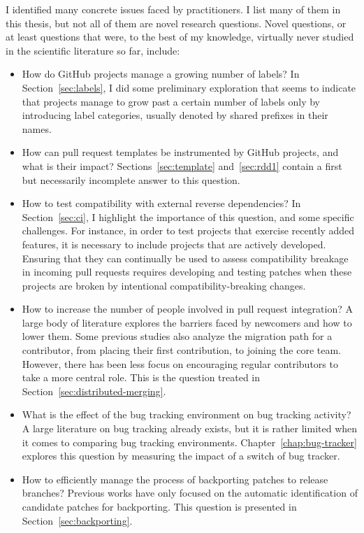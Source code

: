 I identified many concrete issues faced by practitioners.
I list many of them in this thesis, but not all of them are novel research questions.
Novel questions, or at least questions that were, to the best of my knowledge, virtually never studied in the scientific literature so far, include:

\begin{itemize}
	\item How do GitHub projects manage a growing number of labels? In Section~\ref{sec:labels}, I did some preliminary exploration that seems to indicate that projects manage to grow past a certain number of labels only by introducing label categories, usually denoted by shared prefixes in their names.
	\item How can pull request templates be instrumented by GitHub projects, and what is their impact? Sections~\ref{sec:template} and~\ref{sec:rdd1} contain a first but necessarily incomplete answer to this question.
	\item How to test compatibility with external reverse dependencies? In Section~\ref{sec:ci}, I highlight the importance of this question, and some specific challenges. For instance, in order to test projects that exercise recently added features, it is necessary to include projects that are actively developed. Ensuring that they can continually be used to assess compatibility breakage in incoming pull requests requires developing and testing patches when these projects are broken by intentional compatibility-breaking changes.
	\item How to increase the number of people involved in pull request integration? A large body of literature explores the barriers faced by newcomers and how to lower them. Some previous studies also analyze the migration path for a contributor, from placing their first contribution, to joining the core team. However, there has been less focus on encouraging regular contributors to take a more central role. This is the question treated in Section~\ref{sec:distributed-merging}.
	\item What is the effect of the bug tracking environment on bug tracking activity? A large literature on bug tracking already exists, but it is rather limited when it comes to comparing bug tracking environments. Chapter~\ref{chap:bug-tracker} explores this question by measuring the impact of a switch of bug tracker.
	\item How to efficiently manage the process of backporting patches to release branches? Previous works have only focused on the automatic identification of candidate patches for backporting. This question is presented in Section~\ref{sec:backporting}.

\end{itemize}
